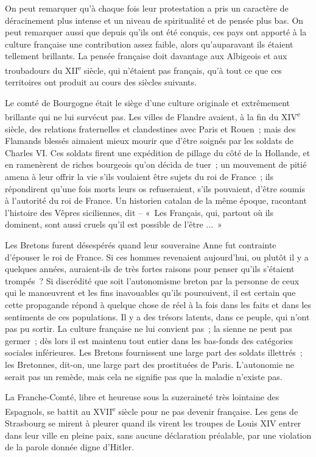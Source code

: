 \documentclass[french,twoside]{book} %
\begin{document}
On peut remarquer qu'à chaque fois leur protestation a pris un caractère de déracinement plus intense et un niveau de spiritualité et de pensée plus bas. On peut remarquer aussi que depuis qu'ils ont été conquis, ces pays ont apporté à la culture française une contribution assez faible, alors qu'auparavant ils étaient tellement brillants. La pensée française doit davantage aux Albigeois et aux troubadours du XII\textsuperscript{e} siècle, qui n'étaient pas français, qu'à tout ce que ces territoires ont produit au cours des siècles suivants.\par
Le comté de Bourgogne était le siège d'une culture originale et extrêmement brillante qui ne lui survécut pas. Les villes de Flandre avaient, à la fin du XIV\textsuperscript{e} siècle, des relations fraternelles et clandestines avec Paris et Rouen ; mais des Flamands blessés aimaient mieux mourir que d'être soignés par les soldats de Charles VI. Ces soldats firent une expédition de pillage du côté de la Hollande, et en ramenèrent de riches bourgeois qu'on décida de tuer ; un mouvement de pitié amena à leur offrir la vie s'ils voulaient être sujets du roi de France ; ils répondirent qu'une fois morts leurs os refuseraient, s'ils pouvaient, d'être soumis à l'autorité du roi de France. Un historien catalan de la même époque, racontant l'histoire des Vêpres siciliennes, dit – « Les Français, qui, partout où ils dominent, sont aussi cruels qu'il est possible de l'être ... »\par
Les Bretons furent désespérés quand leur souveraine Anne fut contrainte d'épouser le roi de France. Si ces hommes revenaient aujourd'hui, ou plutôt il y a quelques années, auraient-ils de très fortes raisons pour penser qu'ils s'étaient trompés ? Si discrédité que soit l'autonomisme breton par la personne de ceux qui le manœuvrent et les fins inavouables qu'ils poursuivent, il est certain que cette propagande répond à quelque chose de réel à la fois dans les faits et dans les sentiments de ces populations. Il y a des trésors latents, dans ce peuple, qui n'ont pas pu sortir. La culture française ne lui convient pas ; la sienne ne peut pas germer ; dès lors il est maintenu tout entier dans les bas-fonds des catégories sociales inférieures. Les Bretons fournissent une large part des soldats illettrés ; les Bretonnes, dit-on, une large part des prostituées de Paris. L'autonomie ne serait pas un remède, mais cela ne signifie pas que la maladie n'existe pas.\par
La Franche-Comté, libre et heureuse sous la suzeraineté très lointaine des Espagnols, se battit au XVII\textsuperscript{e} siècle pour ne pas devenir française. Les gens de Strasbourg se mirent à pleurer quand ils virent les troupes de Louis XIV entrer dans leur ville en pleine paix, sans aucune déclaration préalable, par une violation de la parole donnée digne d'Hitler.\par
\end{document}
